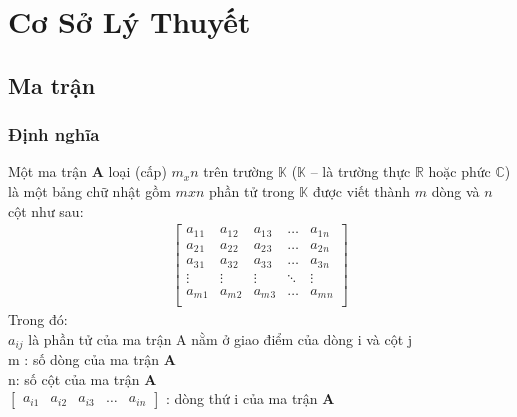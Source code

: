 %
%
%
%
%
\everymath{\displaystyle}  
\chapter{Cơ Sở Lý Thuyết}
\label{chap:chap3}
\section{Ma trận}
\subsection{Định nghĩa}
 Một ma trận \textbf{A} loại (cấp) $m_x n$ trên trường $\mathbb{K}$ ($\mathbb{K}$ – là trường thực $\mathbb{R}$ hoặc phức $\mathbb{C}$) là một bảng chữ nhật gồm $m x n$ phần tử trong $\mathbb{K}$ được viết thành $m$ dòng và $n$ cột như sau:
\begin{align*}
	\begin{bmatrix}
		a_1{}_1 & a_1{}_2 & a_1{}_3  &\ldots& a_1{}_n \\
		a_2{}_1 & a_2{}_2 & a_2{}_3  & \ldots & a_2{}_n \\
		a_3{}_1 & a_3{}_2 & a_3{}_3  & \ldots & a_3{}_n \\
		\vdots & \vdots& \vdots  & \ddots& \vdots\\			
		a_m{}_1 & a_m{}_2 & a_m{}_3 &\ldots& a_m{}_n \\
	\end{bmatrix}	
\end{align*}
Trong đó: \\ 

	 $a_{ij}$ là phần tử của ma trận A nằm ở giao điểm của dòng i và cột j\\
	
	 m : số dòng của ma trận \textbf{A}\\
	
	 n: số cột của ma trận \textbf{A}\\
	
	 
$	\begin{bmatrix}
		a_{i1} & a_{i2}& a_{i3}&\ldots& a_{in}			
	\end{bmatrix}$ : 
	dòng thứ i của ma trận \textbf{A}\\
	
